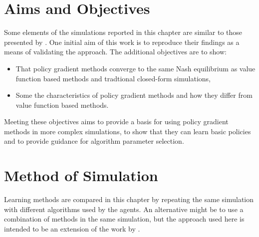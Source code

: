 \section{Aims and Objectives}
Some elements of the simulations reported in this chapter are similar to those
presented by .  One initial aim of this work is to
reproduce their findings as a means of validating the approach.  The additional
objectives are to show:
\begin{itemize}
  \item That policy gradient methods converge to the same Nash equilibrium as
  value function based methods and tradtional closed-form simulations,
  \item Some the characteristics of policy gradient methods and how they differ
  from value function based methods.
\end{itemize}
Meeting these objectives aims to provide a basis for using policy gradient
methods in more complex simulations, to show that they can learn basic policies
and to provide guidance for algorithm parameter selection.

\section{Method of Simulation}
Learning methods are compared in this chapter by repeating the same
simulation with different algorithms used by the agents.  An alternative
might be to use a combination of methods in the same simulation, but the
approach used here is intended to be an extension of the work by
.

